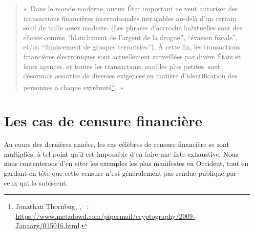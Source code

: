 \begin{quote}
«~Dans le monde moderne, aucun État important ne veut autoriser des transactions financières internationales intraçables au-delà d'un certain seuil de taille assez modeste. (Les phrases d'accroche habituelles sont des choses comme “blanchiment de l'argent de la drogue”, “évasion fiscale”, et/ou “financement de groupes terroristes”). À cette fin, les transactions financières électroniques sont actuellement surveillées par divers États et leurs agences, et toutes les transactions, sauf les plus petites, sont désormais assorties de diverses exigences en matière d'identification des personnes à chaque extrémité\footnote{Jonathan Thornbug, , ~: \url{https://www.metzdowd.com/pipermail/cryptography/2009-January/015016.html}.}.~»
\end{quote} %

\section*{Les cas de censure financière}


Au cours des dernières années, les cas célèbres de censure financière se sont multipliés, à tel point qu'il est impossible d'en faire une liste exhaustive. Nous nous contenterons d'en citer les exemples les plus manifestes en Occident, tout en gardant en tête que cette censure n'est généralement pas rendue publique par ceux qui la subissent.

